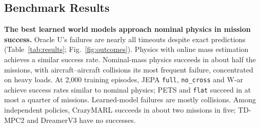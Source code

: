 \documentclass[conference]{IEEEtran}
\begin{document}
\subsection{Benchmark Results}
\textbf{The best learned world models approach nominal physics in mission success.} Oracle U's failures are nearly all timeouts despite exact predictions (Table~\ref{tab:results}; Fig.~\ref{fig:outcomes}). Physics with online mass estimation achieves a similar success rate. Nominal-mass physics succeeds in about half the missions, with aircraft--aircraft collisions its most frequent failure, concentrated on heavy loads. At 2,000 training episodes, JEPA \texttt{full}, \texttt{no\_cross} and W-ar achieve success rates similar to nominal physics; PETS and \texttt{flat} succeed in at most a quarter of missions. Learned-model failures are mostly collisions. Among independent policies, CrazyMARL succeeds in about two missions in five; TD-MPC2 and DreamerV3 have no successes.
\end{document}
